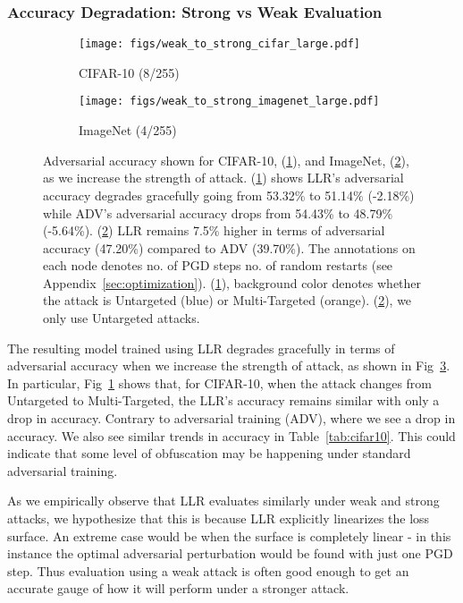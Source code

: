 \documentclass{article}
\theoremstyle{plain}
\theoremstyle{definition}
\theoremstyle{remark}
\begin{document}
\subsubsection{Accuracy Degradation: Strong vs Weak Evaluation}\label{sec:strong_weak}
\begin{figure}[htb]
    \centering
    \hspace{-0.5cm}
    \begin{subfigure}{0.5\textwidth}
    \texttt{[image: figs/weak\_to\_strong\_cifar\_large.pdf]}\caption{CIFAR-10 (8/255)}\label{fig:weak_vs_strong_cifar}
    \end{subfigure}
    \begin{subfigure}{0.5\textwidth}
    \texttt{[image: figs/weak\_to\_strong\_imagenet\_large.pdf]}\caption{ImageNet (4/255)}\label{fig:weak_vs_strong_imagenet}
    \end{subfigure}
    \caption{\small{Adversarial accuracy shown for CIFAR-10, (\ref{fig:weak_vs_strong_cifar}), and ImageNet, (\ref{fig:weak_vs_strong_imagenet}), as we increase the strength of attack. (\ref{fig:weak_vs_strong_cifar}) shows LLR's adversarial accuracy degrades gracefully going from 53.32\% to 51.14\% (-2.18\%) while ADV's adversarial accuracy drops from 54.43\% to 48.79\% (-5.64\%). (\ref{fig:weak_vs_strong_imagenet}) LLR remains 7.5\% higher in terms of adversarial accuracy (47.20\%) compared to ADV (39.70\%). The annotations on each node denotes no. of PGD steps  no. of random restarts (see Appendix~\ref{sec:optimization}). (\ref{fig:weak_vs_strong_cifar}), background color denotes whether the attack is Untargeted (blue) or Multi-Targeted (orange). (\ref{fig:weak_vs_strong_imagenet}), we only use Untargeted attacks.}}
    \label{fig:weak_vs_strong}
\end{figure}
The resulting model trained using LLR degrades gracefully in terms of adversarial accuracy when we increase the strength of attack, as shown in Fig~\ref{fig:weak_vs_strong}. In particular, Fig~\ref{fig:weak_vs_strong_cifar} shows that, for CIFAR-10, when the attack changes from Untargeted to Multi-Targeted, the LLR's accuracy remains similar with only a  drop in accuracy. Contrary to adversarial training (ADV), where we see a  drop in accuracy. We also see similar trends in accuracy in Table~\ref{tab:cifar10}. This could indicate that some level of obfuscation may be happening under standard adversarial training.

As we empirically observe that LLR evaluates similarly under weak and strong attacks, we hypothesize that this is because LLR explicitly linearizes the loss surface. An extreme case would be when the surface is completely linear - in this instance the optimal adversarial perturbation would be found with just one PGD step. Thus evaluation using a weak attack is often good enough to get an accurate gauge of how it will perform under a stronger attack. 
\end{document}
